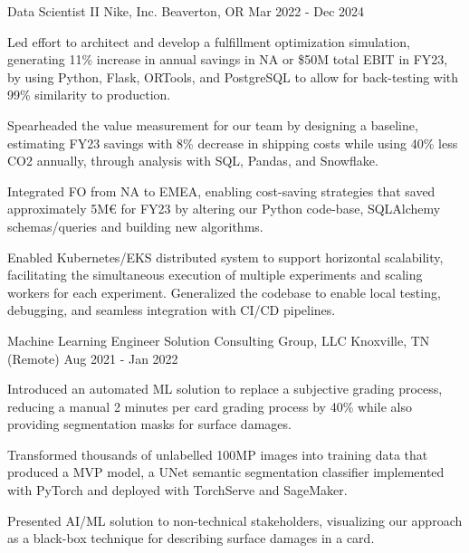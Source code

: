\begin{cventries}
\cventry
{Data Scientist II} %
{Nike, Inc.} %
{Beaverton, OR} %
{Mar 2022 - Dec 2024} %
{ %
\begin{cvitems}
\item {
Led effort to architect and develop a fulfillment optimization simulation, generating 11\% increase in annual savings in NA or \$50M total EBIT in FY23, by using Python, Flask, ORTools, and PostgreSQL to allow for back-testing with 99\% similarity to production.
}
\item {
Spearheaded the value measurement for our team by designing a baseline, estimating FY23 savings with 8\% decrease in shipping costs while using 40\% less CO2 annually, through analysis with SQL, Pandas, and Snowflake.
}
\item {
Integrated FO from NA to EMEA, enabling cost-saving strategies that saved approximately 5M€ for FY23 by altering our Python code-base, SQLAlchemy schemas/queries and building new algorithms.
}
\item {
Enabled Kubernetes/EKS distributed system to support horizontal scalability, facilitating the simultaneous execution of multiple experiments and scaling workers for each experiment. Generalized the codebase to enable local testing, debugging, and seamless integration with CI/CD pipelines.
}
\end{cvitems}
}


\cventry
{Machine Learning Engineer} %
{Solution Consulting Group, LLC} %
{Knoxville, TN (Remote)} %
{Aug 2021 - Jan 2022} %
{ %
\begin{cvitems}
\item {Introduced an automated ML solution to replace a subjective grading process, reducing a manual 2 minutes per card grading process by 40\% while also providing segmentation masks for surface damages.}
\item {Transformed thousands of unlabelled 100MP images into training data that produced a MVP model, a UNet semantic segmentation classifier implemented with PyTorch and deployed with TorchServe and SageMaker.}
\item {Presented AI/ML solution to non-technical stakeholders, visualizing our approach as a black-box technique for describing surface damages in a card.}
\end{cvitems}
}


\end{cventries}
